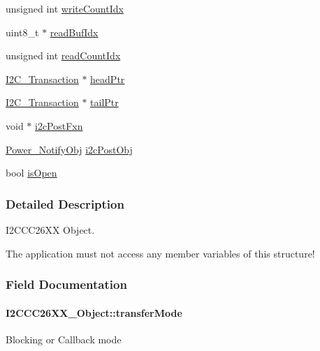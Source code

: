 \begin{DoxyCompactItemize}
unsigned int \hyperlink{struct_i2_c_c_c26_x_x___object_a8b01e2705b597bc44164bafa3a14af6e}{write\+Count\+Idx}
\item 
uint8\+\_\+t $\ast$ \hyperlink{struct_i2_c_c_c26_x_x___object_ad39b7ffb7de097aecda32d14005df8cd}{read\+Buf\+Idx}
\item 
unsigned int \hyperlink{struct_i2_c_c_c26_x_x___object_a012990d843f7189a488e072708bb4490}{read\+Count\+Idx}
\item 
\hyperlink{struct_i2_c___transaction}{I2\+C\+\_\+\+Transaction} $\ast$ \hyperlink{struct_i2_c_c_c26_x_x___object_a7148eed6e39ab2ab626c53030c7b77bb}{head\+Ptr}
\item 
\hyperlink{struct_i2_c___transaction}{I2\+C\+\_\+\+Transaction} $\ast$ \hyperlink{struct_i2_c_c_c26_x_x___object_a6cd1216ab6faa1e951186dfe696f841b}{tail\+Ptr}
\item 
void $\ast$ \hyperlink{struct_i2_c_c_c26_x_x___object_a6a7aaccb2b2b05d9fd9230924acf9e96}{i2c\+Post\+Fxn}
\item 
\hyperlink{struct_power___notify_obj}{Power\+\_\+\+Notify\+Obj} \hyperlink{struct_i2_c_c_c26_x_x___object_a2b16c813ec8f21896de5eecf03ed4178}{i2c\+Post\+Obj}
\item 
bool \hyperlink{struct_i2_c_c_c26_x_x___object_a4c74297d4652d9f61558ca4099867686}{is\+Open}
\end{DoxyCompactItemize}


\subsubsection{Detailed Description}
I2\+C\+C\+C26\+X\+X Object. 

The application must not access any member variables of this structure! 

\subsubsection{Field Documentation}
\paragraph[{transfer\+Mode}]{ I2\+C\+C\+C26\+X\+X\+\_\+\+Object\+::transfer\+Mode}\label{struct_i2_c_c_c26_x_x___object_a64cd64cf328013bebacf75feaa17f127}
Blocking or Callback mode 
